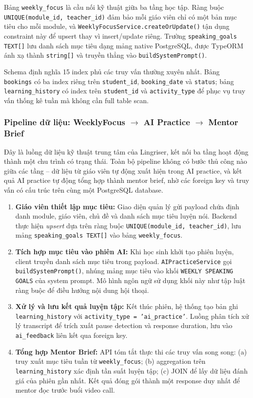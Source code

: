 Bảng \texttt{weekly\_focus} là cầu nối kỹ thuật giữa ba tầng học tập. Ràng buộc \texttt{UNIQUE(module\_id, teacher\_id)} đảm bảo mỗi giáo viên chỉ có một bản mục tiêu cho mỗi module, và \texttt{WeeklyFocusService.createOrUpdate()} tận dụng constraint này để upsert thay vì insert/update riêng. Trường \texttt{speaking\_goals TEXT[]} lưu danh sách mục tiêu dạng mảng native PostgreSQL, được TypeORM ánh xạ thành \texttt{string[]} và truyền thẳng vào \texttt{buildSystemPrompt()}.

Schema định nghĩa 15 index phủ các truy vấn thường xuyên nhất. Bảng \texttt{bookings} có ba index riêng trên \texttt{student\_id}, \texttt{booking\_date} và \texttt{status}; bảng \texttt{learning\_history} có index trên \texttt{student\_id} và \texttt{activity\_type} để phục vụ truy vấn thống kê tuần mà không cần full table scan.

\subsubsection{Pipeline dữ liệu: WeeklyFocus $\rightarrow$ AI Practice $\rightarrow$ Mentor Brief}

Đây là luồng dữ liệu kỹ thuật trung tâm của Lingriser, kết nối ba tầng hoạt động thành một chu trình có trạng thái. Toàn bộ pipeline không có bước thủ công nào giữa các tầng -- dữ liệu từ giáo viên tự động xuất hiện trong AI practice, và kết quả AI practice tự động tổng hợp thành mentor brief, nhờ các foreign key và truy vấn có cấu trúc trên cùng một PostgreSQL database.

\begin{enumerate}
    \item \textbf{Giáo viên thiết lập mục tiêu:} Giao diện quản lý gửi payload chứa định danh module, giáo viên, chủ đề và danh sách mục tiêu luyện nói. Backend thực hiện \textit{upsert} dựa trên ràng buộc \texttt{UNIQUE(module\_id, teacher\_id)}, lưu mảng \texttt{speaking\_goals TEXT[]} vào bảng \texttt{weekly\_focus}.

    \item \textbf{Tích hợp mục tiêu vào phiên AI:} Khi học sinh khởi tạo phiên luyện, client truyền danh sách mục tiêu trong payload. \texttt{AIPracticeService} gọi \texttt{buildSystemPrompt()}, nhúng mảng mục tiêu vào khối \texttt{WEEKLY SPEAKING GOALS} của system prompt. Mô hình ngôn ngữ sử dụng khối này như tập luật ràng buộc để điều hướng nội dung hội thoại.

    \item \textbf{Xử lý và lưu kết quả luyện tập:} Kết thúc phiên, hệ thống tạo bản ghi \texttt{learning\_history} với \texttt{activity\_type = 'ai\_practice'}. Luồng phân tích xử lý transcript để trích xuất pause detection và response duration, lưu vào \texttt{ai\_feedback} liên kết qua foreign key.

    \item \textbf{Tổng hợp Mentor Brief:} API tóm tắt thực thi các truy vấn song song: (a) truy xuất mục tiêu tuần từ \texttt{weekly\_focus}; (b) aggregation trên \texttt{learning\_history} xác định tần suất luyện tập; (c) JOIN để lấy dữ liệu đánh giá của phiên gần nhất. Kết quả đóng gói thành một response duy nhất để mentor đọc trước buổi video call.
\end{enumerate}

